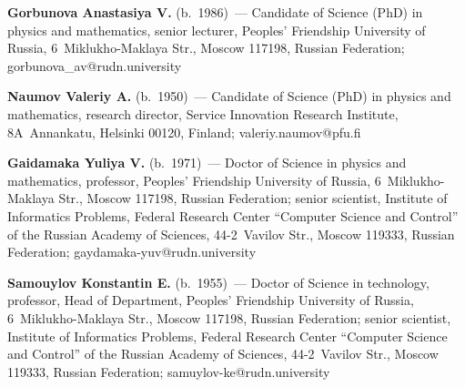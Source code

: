 
\Contr


\noindent
\textbf{Gorbunova Anastasiya V.} (b.\ 1986)~--- 
Candidate of Science (PhD) in physics and mathematics, 
senior lecturer, Peoples' Friendship University of Russia, 
6~Miklukho-Maklaya Str., Moscow 117198, Russian Federation; 
\mbox{gorbunova\_av@rudn.university}

\vspace*{3pt}


\noindent
\textbf{Naumov Valeriy A.} (b.\ 1950)~--- Candidate of Science (PhD) 
in physics and mathematics, research director, 
Service Innovation Research Institute, 
8A~Annankatu, Helsinki 00120, Finland; \mbox{valeriy.naumov@pfu.fi}

\vspace*{3pt}

\noindent
\textbf{Gaidamaka Yuliya V.} (b.\ 1971)~--- Doctor of Science in physics and mathematics, 
professor, Peoples' Friendship University of Russia, 6~Miklukho-Maklaya Str., 
Moscow 117198, Russian Federation; senior scientist, 
Institute of Informatics Problems, Federal Research Center 
``Computer Science and Control'' of the Russian Academy of Sciences, 
44-2~Vavilov Str., Moscow 119333, Russian Federation; 
\mbox{gaydamaka-yuv@rudn.university}

\vspace*{3pt}

\noindent
\textbf{Samouylov Konstantin E.} (b.\ 1955)~--- 
Doctor of Science in technology, professor, Head of Department, 
Peoples' Friendship University of Russia, 6~Miklukho-Maklaya Str., 
Moscow 117198, Russian Federation; senior scientist, 
Institute of Informatics Problems, Federal Research Center 
``Computer Science and Control'' of the Russian Academy of Sciences, 
44-2~Vavilov Str., Moscow 119333, Russian Federation; 
\mbox{samuylov-ke@rudn.university}
\label{end\stat}

\renewcommand{\bibname}{\protect\rm Литература}       